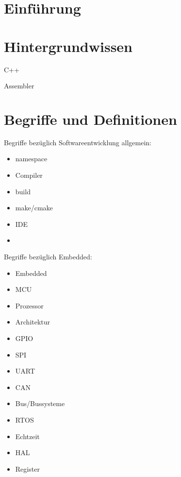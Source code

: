\section{Einführung}



\section{Hintergrundwissen}
C++

Assembler


\section{Begriffe und Definitionen}
Begriffe bezüglich Softwareentwicklung allgemein:
\begin{itemize}
	\item namespace
	\item Compiler
	\item build
	\item make/cmake
	\item IDE
	\item 
\end{itemize}


Begriffe bezüglich Embedded:
\begin{itemize}
	\item Embedded
	\item MCU
	\item Prozessor
	\item Architektur
	\item GPIO
	\item SPI
	\item UART
	\item CAN
	\item Bus/Bussysteme
	\item RTOS
	\item Echtzeit
	\item HAL
	\item Register
\end{itemize}

